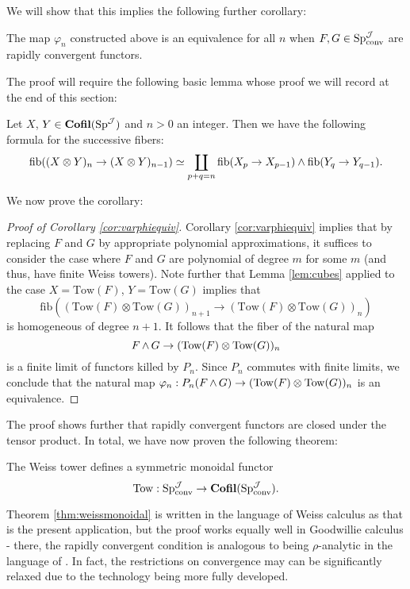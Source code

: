 We will show that this implies the following further corollary:

\begin{cor}\label{cor:varphiequiv}
The map $\varphi_n$ constructed above is an equivalence for all $n$ when $F,G\in \operatorname{\mathrm{Sp}}^{\operatorname{\mathcal{J}}}_{\text{conv}}$ are rapidly convergent functors.  
\end{cor}
The proof will require the following basic lemma whose proof we will record at the end of this section: 
\begin{lem}\label{lem:cubes}
Let $X$, $Y \in \operatorname{\mathbf{Cofil}}(\operatorname{\mathrm{Sp}}^{\operatorname{\mathcal{J}}})$ and $n>0$ an integer.  Then we have the following formula for the successive fibers: $$\operatorname{\mathrm{fib}} ((X\otimes Y)_{n} \to (X\otimes Y)_{n-1}) \simeq \coprod_{p+q=n} \operatorname{\mathrm{fib}} (X_p\to X_{p-1}) \wedge \operatorname{\mathrm{fib}} (Y_q \to Y_{q-1}).$$
\end{lem}

We now prove the corollary:

\begin{proof}[Proof of Corollary \ref{cor:varphiequiv}]
Corollary \ref{cor:varphiequiv} implies that by replacing $F$ and $G$ by appropriate polynomial approximations, it suffices to consider the case where $F$ and $G$ are polynomial of degree $m$ for some $m$ (and thus, have finite Weiss towers).   Note further that Lemma \ref{lem:cubes} applied to the case $X = \mathrm{Tow}(F)$, $Y=\mathrm{Tow}(G)$ implies that $$\text{fib}((\mathrm{Tow}(F)\otimes \mathrm{Tow}(G) )_{n+1} \to (\mathrm{Tow}(F) \otimes \mathrm{Tow}(G))_n)$$ is homogeneous of degree $n+1$.  It follows that the fiber of the natural map $$F\operatorname{\wedge} G \to (\mathrm{Tow}(F)\otimes \mathrm{Tow}(G))_n$$  is a finite limit of functors killed by $P_n$.  Since $P_n$ commutes with finite limits, we conclude that the natural map $\varphi_n: P_n(F\operatorname{\wedge} G)\to (\mathrm{Tow}(F)\otimes \mathrm{Tow}(G))_n$ is an equivalence.  
\end{proof}

The proof shows further that rapidly convergent functors are closed under the tensor product.  In total, we have now proven the following theorem:

\begin{thm}\label{thm:weissmonoidal}
The Weiss tower defines a symmetric monoidal functor $$\mathrm{Tow}: \operatorname{\mathrm{Sp}}^{\operatorname{\mathcal{J}}}_{\text{conv}} \to \operatorname{\mathbf{Cofil}}(\operatorname{\mathrm{Sp}}^{\operatorname{\mathcal{J}}}_{\text{conv}}).$$
\end{thm}
\begin{rmk}\label{rmk:goodwilliecase}
Theorem \ref{thm:weissmonoidal} is written in the language of Weiss calculus as that is the present application, but the proof works equally well in Goodwillie calculus - there, the rapidly convergent condition is analogous to being $\rho$-analytic in the language of \cite{GoodwillieII}.  In fact, the restrictions on convergence may can be significantly relaxed due to the technology being more fully developed.  %
\end{rmk}

